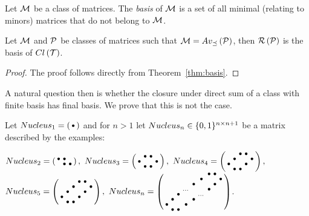 \begin{defn}
Let $\mathcal{M}$ be a class of matrices. The \emph{basis} of $\mathcal{M}$ is a set of all minimal (relating to minors) matrices that do not belong to $\mathcal{M}$.
\end{defn}

\begin{cor}
Let $\mathcal{M}$ and $\mathcal{P}$ be classes of matrices such that $\mathcal{M}=Av_{\preceq}\left(\mathcal{P}\right)$, then $\mathcal{R}\left(\mathcal{P}\right)$ is the basis of $Cl\left(\mathcal{T}\right)$.
\end{cor}
\begin{proof}
The proof follows directly from Theorem~\ref{thm:basis}.
\end{proof}

A natural question then is whether the closure under direct sum of a class with finite basis has final basis. We prove that this is not the case.

\begin{defn}
Let $Nucleus_1=\left(\begin{smallmatrix}\bullet\end{smallmatrix}\right)$ and for $n>1$ let $Nucleus_n\in\{0,1\}^{n\times n+1}$ be a matrix described by the examples:
\begin{center}
$Nucleus_2=\smm{\bullet&\bullet& \\ &\bullet&\bullet},\ 
Nucleus_3=\smm{ &\bullet&\bullet& \\\bullet& & &\bullet\\ &\bullet&\bullet& },\ 
Nucleus_4=\smm{ & &\bullet&\bullet& \\ &\bullet& & &\bullet\\\bullet& & &\bullet& \\ &\bullet&\bullet& & },$\\
$Nucleus_5=\smm{ & & &\bullet&\bullet& \\ & &\bullet& & &\bullet\\ &\bullet& & &\bullet& \\\bullet& & &\bullet& & \\ &\bullet&\bullet& & & },\ 
Nucleus_n=\smm{ & & & & & &\bullet&\bullet& \\ & & & & &\bullet& & &\bullet\\ & & & &\bullet& & &\bullet& \\ & & &\dots& & &\bullet& & \\ & &\bullet& & &\dots& & & \\ &\bullet& & &\bullet& & & & \\\bullet& & &\bullet& & & & & \\ &\bullet&\bullet& & & & & & \\}$.
\end{center}
\end{defn}

